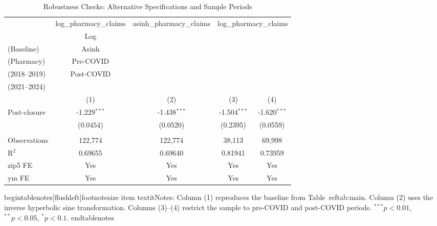 \begin{table}[htbp]
   \caption{\label{tab:robust} Robustness Checks: Alternative Specifications and Sample Periods}
   \bigskip
   \centering
   \begin{adjustbox}{max width=\textwidth}
\begin{tabular}{lcccc}
      \toprule
       & log\_pharmacy\_claims & asinh\_pharmacy\_claims & \multicolumn{2}{c}{log\_pharmacy\_claims}\\
                   & Log\\(Baseline)   & Asinh\\(Pharmacy)   & Pre-COVID\\(2018--2019)   & Post-COVID\\(2021--2024) \\     
                   & (1)               & (2)                 & (3)                       & (4)\\  
      \midrule 
      Post-closure & -1.229$^{***}$    & -1.438$^{***}$      & -1.504$^{***}$            & -1.620$^{***}$\\   
                   & (0.0454)          & (0.0520)            & (0.2395)                  & (0.0559)\\   
       \\
      Observations & 122,774           & 122,774             & 38,113                    & 69,998\\  
      R$^2$        & 0.69655           & 0.69640             & 0.81941                   & 0.73959\\  
      \midrule 
      zip5 FE      & Yes               & Yes                 & Yes                       & Yes\\  
      ym FE        & Yes               & Yes                 & Yes                       & Yes\\  
      \bottomrule
   \end{tabular}
\end{adjustbox}
begin{tablenotes}[flushleft]footnotesize
item textit{Notes:} Column (1) reproduces the baseline from Table~ref{tab:main}. Column (2) uses the inverse hyperbolic sine transformation. Columns (3)--(4) restrict the sample to pre-COVID and post-COVID periods. $^{***}p<0.01$, $^{**}p<0.05$, $^{*}p<0.1$.
end{tablenotes}
\end{table}
